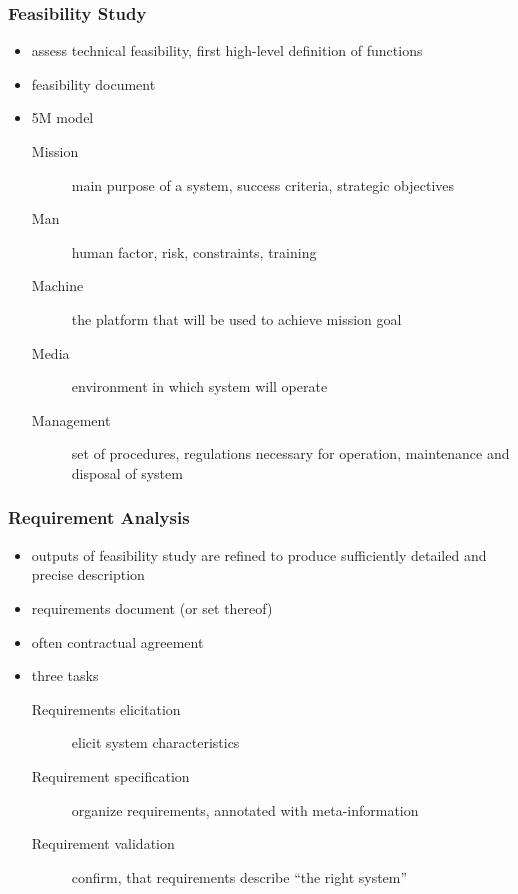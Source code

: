 \documentclass[a4paper, 10pt]{article}
\begin{document}
\subsubsection*{Feasibility Study}
\begin{itemize}
    \item assess technical feasibility, first high-level definition of functions
    \item[\follows] feasibility document
    \item 5M model
    \begin{description}
        \item[Mission] main purpose of a system, success criteria, strategic objectives
        \item[Man] human factor, risk, constraints, training
        \item[Machine] the platform that will be used to achieve mission goal
        \item[Media] environment in which system will operate
        \item[Management] set of procedures, regulations necessary for operation, maintenance and disposal of system
    \end{description}
\end{itemize}

\subsubsection*{Requirement Analysis}
\begin{itemize}
    \item outputs of feasibility study are refined to produce sufficiently detailed and precise description
    \item[\follows] requirements document (or set thereof)
    \item often contractual agreement
    \item three tasks
    \begin{description}
        \item[Requirements elicitation] elicit system characteristics
        \item[Requirement specification] organize requirements, annotated with meta-information
        \item[Requirement validation] confirm, that requirements describe ``the right system''
    \end{description}
\end{itemize}
\end{document}
